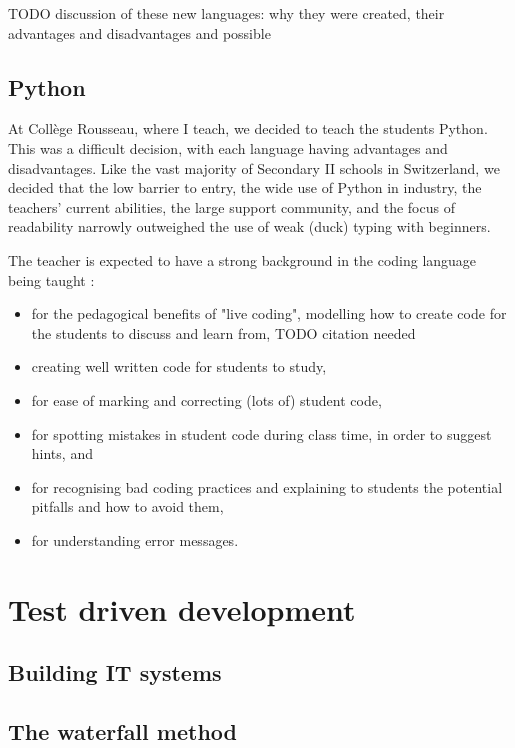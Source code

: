 \documentclass[10pt]{article}
\begin{document}
TODO discussion of these new languages: why they were created, their advantages and disadvantages and possible 

\subsection{Python}
At Collège Rousseau, where I teach, we decided to teach the students Python. This was a difficult decision, with each language having advantages and disadvantages. Like the vast majority of Secondary II schools in Switzerland, we decided that the low barrier to entry, the wide use of Python in industry, the teachers' current abilities, the large support community, and the focus of readability narrowly outweighed the use of weak (duck) typing with beginners.

The teacher is expected to have a strong background in the coding language being taught :
\begin{itemize}
\item for the pedagogical benefits of "live coding", modelling how to create code for the students to discuss and learn from, TODO citation needed
\item creating well written code for students to study,
\item for ease of marking and correcting (lots of) student code,
\item for spotting mistakes in student code during class time, in order to suggest hints, and
\item for recognising bad coding practices and explaining to students the potential pitfalls and how to avoid them,
\item for understanding error messages.
\end{itemize}







\section{Test driven development} \label{tdd}

\subsection{Building IT systems}

\subsection{The waterfall method}
\end{document}
